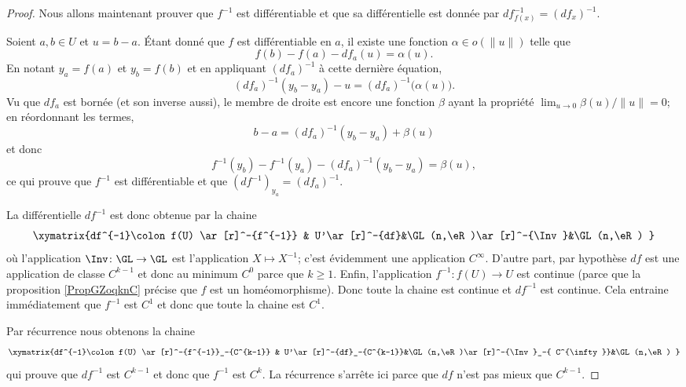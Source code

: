 \begin{proof}
    Nous allons maintenant prouver que \( f^{-1}\) est différentiable et que sa différentielle est donnée par \( df^{-1}_{f(x)}=(df_x)^{-1}\).

    Soient \( a,b\in U\) et \( u=b-a\). Étant donné que \( f\) est différentiable en \( a\), il existe une fonction \( \alpha\in o(\| u \|)\) telle que
    \begin{equation}
        f(b)-f(a)-df_a(u)=\alpha(u).
    \end{equation}
    En notant \( y_a=f(a)\) et \( y_b=f(b)\) et en appliquant \( (df_a)^{-1}\) à cette dernière équation,
    \begin{equation}
        (df_a)^{-1}(y_b-y_a)-u=(df_a)^{-1} \big( \alpha(u) \big).
    \end{equation}
    Vu que \( df_a\) est bornée (et son inverse aussi), le membre de droite est encore une fonction \( \beta\) ayant la propriété \( \lim_{u\to 0}\beta(u)/\| u \|=0\); en réordonnant les termes,
    \begin{equation}
        b-a=(df_a)^{-1}(y_b-y_a)+\beta(u)
    \end{equation}
    et donc
    \begin{equation}
        f^{-1}(y_b)-f^{-1}(y_a)-(df_a)^{-1}(y_b-y_a)=\beta(u),
    \end{equation}
    ce qui prouve que \( f^{-1}\) est différentiable et que \( (df^{-1})_{y_a}=(df_a)^{-1}\).

    La différentielle \( df^{-1}\) est donc obtenue par la chaine
    \begin{equation}
    \xymatrix{%
        df^{-1}\colon f(U) \ar[r]^-{f^{-1}}     &   U'\ar[r]^-{df}&\GL(n,\eR)\ar[r]^-{\Inv}&\GL(n,\eR)
       }
    \end{equation}
    où l'application \( \Inv\colon \GL\to \GL\) est l'application \( X\mapsto X^{-1}\); c'est évidemment une application \(  C^{\infty}\). D'autre part, par hypothèse \( df\) est une application de classe \( C^{k-1}\) et donc au minimum \( C^0\) parce que \( k\geq 1\). Enfin, l'application \( f^{-1}\colon f(U)\to U\) est continue (parce que la proposition \ref{PropGZoqknC} précise que \( f\) est un homéomorphisme). Donc toute la chaine est continue et \( df^{-1}\) est continue. Cela entraine immédiatement que \( f^{-1}\) est \( C^1\) et donc que toute la chaine est \( C^1\).

    Par récurrence nous obtenons la chaine
    \begin{equation}
    \xymatrix{%
        df^{-1}\colon f(U) \ar[r]^-{f^{-1}}_-{C^{k-1}}     &   U'\ar[r]^-{df}_-{C^{k-1}}&\GL(n,\eR)\ar[r]^-{\Inv}_-{ C^{\infty}}&\GL(n,\eR)
       }
    \end{equation}
    qui prouve que \( df^{-1}\) est \( C^{k-1} \) et donc que \( f^{-1}\) est \( C^k\). La récurrence s'arrête ici parce que \( df\) n'est pas mieux que \( C^{k-1}\).
\end{proof}

